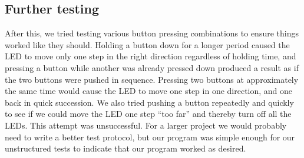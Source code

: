 \subsection{Further testing}
After this, we tried testing various button pressing combinations to ensure things worked like they should. Holding a button down for a longer period caused the LED to move only one step in the right direction regardless of holding time, and pressing a button while another was already pressed down produced a result as if the two buttons were pushed in sequence. Pressing two buttons at approximately the same time would cause the LED to move one step in one direction, and one back in quick succession. We also tried pushing a button repeatedly and quickly to see if we could move the LED one step ``too far'' and thereby turn off all the LEDs. This attempt was unsuccessful. For a larger project we would probably need to write a better test protocol, but our program was simple enough for our unstructured tests to indicate that our program worked as desired.



